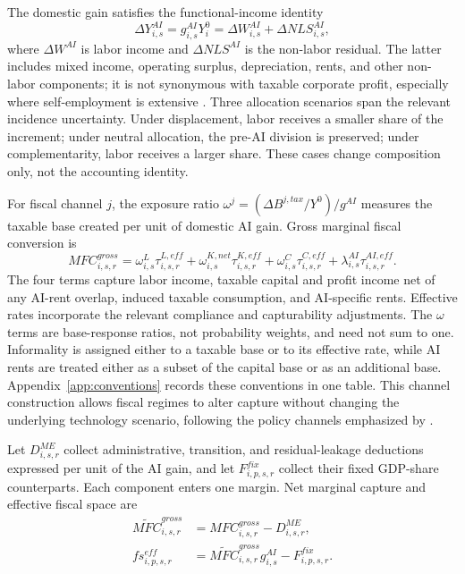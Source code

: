 The domestic gain satisfies the functional-income identity
\begin{equation}
  \Delta Y^{AI}_{i,s}
  =g^{AI}_{i,s}Y_i^0
  =\Delta W^{AI}_{i,s}+\Delta NLS^{AI}_{i,s},
  \label{eq:income_identity_clean}
\end{equation}
where $\Delta W^{AI}$ is labor income and $\Delta NLS^{AI}$ is the non-labor residual. The latter includes mixed income, operating surplus, depreciation, rents, and other non-labor components; it is not synonymous with taxable corporate profit, especially where self-employment is extensive \citep{gollin2002getting}. Three allocation scenarios span the relevant incidence uncertainty. Under displacement, labor receives a smaller share of the increment; under neutral allocation, the pre-AI division is preserved; under complementarity, labor receives a larger share. These cases change composition only, not the accounting identity.

For fiscal channel $j$, the exposure ratio $\omega^j=(\Delta B^{j,tax}/Y^0)/g^{AI}$ measures the taxable base created per unit of domestic AI gain. Gross marginal fiscal conversion is
\begin{equation}
  MFC^{gross}_{i,s,r}
  =\omega^L_{i,s}\tau^{L,eff}_{i,s,r}
  +\omega^{K,net}_{i,s}\tau^{K,eff}_{i,s,r}
  +\omega^C_{i,s}\tau^{C,eff}_{i,s,r}
  +\lambda^{AI}_{i,s}\tau^{AI,eff}_{i,s,r}.
  \label{eq:mfc_clean}
\end{equation}
The four terms capture labor income, taxable capital and profit income net of any AI-rent overlap, induced taxable consumption, and AI-specific rents. Effective rates incorporate the relevant compliance and capturability adjustments. The $\omega$ terms are base-response ratios, not probability weights, and need not sum to one. Informality is assigned either to a taxable base or to its effective rate, while AI rents are treated either as a subset of the capital base or as an additional base. Appendix~\ref{app:conventions} records these conventions in one table. This channel construction allows fiscal regimes to alter capture without changing the underlying technology scenario, following the policy channels emphasized by \citet{brollo2024fiscal}.

Let $D^{ME}_{i,s,r}$ collect administrative, transition, and residual-leakage deductions expressed per unit of the AI gain, and let $F^{fix}_{i,p,s,r}$ collect their fixed GDP-share counterparts. Each component enters one margin. Net marginal capture and effective fiscal space are
\begin{align}
  \widetilde{MFC}^{gross}_{i,s,r}
    &=MFC^{gross}_{i,s,r}-D^{ME}_{i,s,r},
    \label{eq:mfc_tilde_clean}\\
  fs^{eff}_{i,p,s,r}
    &=\widetilde{MFC}^{gross}_{i,s,r}g^{AI}_{i,s}-F^{fix}_{i,p,s,r}.
    \label{eq:fiscal_space_clean}
\end{align}

